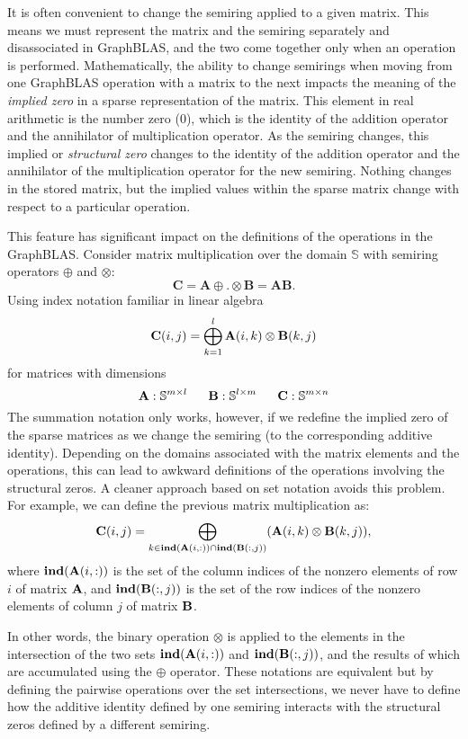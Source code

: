 It is often convenient to change the semiring applied
to a given matrix.  This means we must represent the matrix and the semiring separately and disassociated in GraphBLAS,
and the two come together only when an operation is performed.
Mathematically, the ability to change semirings 
when moving from one GraphBLAS operation with a matrix to the next impacts the meaning of 
the \emph{implied zero} in a sparse representation of the matrix.
This element in real arithmetic is the number zero ($0$), which is the 
identity of the addition operator and the annihilator of
multiplication operator.   As the semiring changes, this 
implied or \emph{structural zero} changes to the identity of 
the addition operator and the annihilator of the multiplication 
operator for the new semiring.   Nothing changes in the
stored matrix, but the implied values within the sparse matrix change
with respect to a particular operation.  

This feature has significant impact on the definitions of the operations in the GraphBLAS.   
Consider matrix multiplication over the domain $\mathbb{S}$ 
with semiring operators 
$\oplus$ and $\otimes$:
 $$
   \mathbf{C} = \mathbf{A} {\oplus}.{\otimes} \mathbf{B} = \mathbf{A} \mathbf{B}.
$$
Using index notation familiar in linear algebra
  $$
   {\bf C}(i,j) = \bigoplus_{k=1}^l {\bf A}(i,k) \otimes {\bf B}(k,j)
  $$
for matrices with dimensions
$$
  {\bf A} : \mathbb{S}^{m \times l} ~~~~~
  {\bf B} : \mathbb{S}^{l \times m} ~~~~~
  {\bf C} : \mathbb{S}^{m \times n}
$$
The summation notation only works, however, if we redefine the implied zero of the 
sparse matrices as we change the semiring (to the corresponding additive identity).   Depending on the domains associated with the
matrix elements and the operations, this can lead to awkward definitions of the
operations involving the structural zeros.  A cleaner approach based on set notation
avoids this problem.  For example, we can define the previous matrix multiplication
as:   
$$
\bold{C}(i,j)
= \bigoplus_{k \in \bold{ind}({\bf {A}}(i,:)) \cap
\bold{ind}({\bf {B}}(:,j))} ({\bf {A}}(i,k)
\otimes {\bf {B}}(k,j)),
$$ 
where $\bold{ind}({\bf {A}}(i,:))$ is the set of the column indices of the 
nonzero elements of row $i$ of matrix $\bold{A}$, and
$\bold{ind}({\bf {B}}(:,j))$ is the set of the row indices of the 
nonzero elements of column $j$ of matrix $\bold{B}$.

In other words, the binary operation $\otimes$ is applied to the elements in the intersection of the 
two sets $\bold{ind}({\bf {A}}(i,:))$ and $\bold{ind}({\bf {B}}(:,j))$, and the results of which are accumulated using the $\oplus$ operator.
These notations are equivalent but by defining the pairwise operations over
the set intersections, we never have to define how the additive identity defined by one
semiring interacts with the structural zeros defined by a different semiring.


